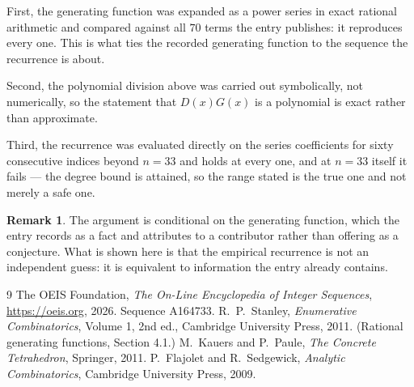 \documentclass[11pt,a4paper]{article}
\theoremstyle{plain}
\theoremstyle{definition}
\newtheorem{remark}[theorem]{Remark}
\begin{document}
First, the generating function was expanded as a power series in exact rational arithmetic and
compared against all $70$ terms the entry publishes: it reproduces every one. This is
what ties the recorded generating function to the sequence the recurrence is about.

Second, the polynomial division above was carried out symbolically, not numerically, so the
statement that $D(x)G(x)$ is a polynomial is exact rather than approximate.

Third, the recurrence was evaluated directly on the series coefficients for sixty consecutive
indices beyond $n=33$ and holds at every one, and at $n=33$ itself it fails --- the
degree bound is attained, so the range stated is the true one and not merely a safe one.

\begin{remark}
The argument is conditional on the generating function, which the entry records as a fact and
attributes to a contributor rather than offering as a conjecture. What is shown here is that
the empirical recurrence is not an independent guess: it is equivalent to information the
entry already contains.
\end{remark}

\begin{thebibliography}{9}
 The OEIS Foundation, \emph{The On-Line Encyclopedia of Integer
Sequences}, \url{https://oeis.org}, 2026. Sequence A164733.
 R.~P.~Stanley, \emph{Enumerative Combinatorics}, Volume 1, 2nd ed.,
Cambridge University Press, 2011. (Rational generating functions, Section 4.1.)
 M.~Kauers and P.~Paule, \emph{The Concrete Tetrahedron}, Springer, 2011.
 P.~Flajolet and R.~Sedgewick, \emph{Analytic Combinatorics}, Cambridge
University Press, 2009.
\end{thebibliography}
\end{document}
